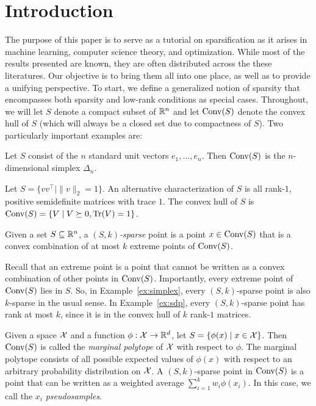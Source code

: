 \documentclass[paper.tex]{subfiles}
\begin{document}
\section{Introduction} 
\label{sec:intro}

The purpose of this paper is to serve as a tutorial on sparsification as it arises 
in machine learning, computer science theory, and optimization. While most of the 
results presented are known, they are often distributed across the these 
literatures. Our objective is to bring them all into one place, 
as well as to provide a unifying perspective. To start, 
we define a generalized notion of sparsity that encompasses both sparsity and 
low-rank conditions as special cases. Throughout, we will let $S$ denote a 
compact subset of $\mathbb{R}^n$ and let $\operatorname{Conv}(S)$ denote the convex hull of $S$ 
(which will always be a closed set due to compactness of $S$). Two particularly 
important examples are:
\begin{example}
\label{ex:simplex}
Let $S$ consist of the $n$ standard unit vectors $e_1, \ldots, e_n$. Then 
$\operatorname{Conv}(S)$ is the $n$-dimensional simplex $\Delta_n$.
\end{example}

\begin{example}
\label{ex:sdp}
Let $S = \{vv^{\top} \mid \|v\|_2 = 1\}$. An alternative characterization 
of $S$ is all rank-$1$, positive semidefinite matrices with trace $1$. The 
convex hull of $S$ is $\operatorname{Conv}(S) = \{V \mid V \succeq 0, \operatorname{Tr}(V) = 1\}$.
\end{example}

\begin{definition}
Given a set $S \subseteq \mathbb{R}^n$, a \emph{$(S, k)$-sparse} point is a point 
$x \in \operatorname{Conv}(S)$ that is a convex combination of at most $k$ extreme 
points of $\operatorname{Conv}(S)$.
\end{definition}

Recall that an extreme point is a point that cannot be written as a convex 
combination of other points in $\operatorname{Conv}(S)$. Importantly, every extreme point 
of $\operatorname{Conv}(S)$ lies in $S$. So, in Example~\ref{ex:simplex}, every 
$(S,k)$-sparse point is also $k$-sparse in the usual sense. In 
Example~\ref{ex:sdp}, every $(S,k)$-sparse point has rank at most $k$, since 
it is in the convex hull of $k$ rank-$1$ matrices.

\begin{example}
\label{ex:marginal-polytope}
Given a space $\mathcal{X}$ and a function $\phi : \mathcal{X} \to \mathbb{R}^d$, let 
$S = \{\phi(x) \mid x \in \mathcal{X}\}$. Then $\operatorname{Conv}(S)$ is called the 
\emph{marginal polytope} of $\mathcal{X}$ with respect to $\phi$. The 
marginal polytope consists of all possible expected values of 
$\phi(x)$ with respect to an arbitrary probability distribution 
on $\mathcal{X}$. A $(S,k)$-sparse point in $\operatorname{Conv}(S)$ is a point that 
can be written as a weighted average $\sum_{i=1}^k w_i \phi(x_i)$. 
In this case, we call the $x_i$ \emph{pseudosamples}.
\end{example}
\end{document}
